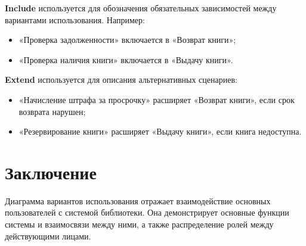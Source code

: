 \documentclass[a4paper,12pt]{article}
\begin{document}
\textbf{Include} используется для обозначения обязательных зависимостей между вариантами использования. Например:
\begin{itemize}
    \item «Проверка задолженности» включается в «Возврат книги»;
    \item «Проверка наличия книги» включается в «Выдачу книги».
\end{itemize}

\textbf{Extend} используется для описания альтернативных сценариев:
\begin{itemize}
    \item «Начисление штрафа за просрочку» расширяет «Возврат книги», если срок возврата нарушен;
    \item «Резервирование книги» расширяет «Выдачу книги», если книга недоступна.
\end{itemize}

\section{Заключение}

Диаграмма вариантов использования отражает взаимодействие основных пользователей с системой библиотеки. 
Она демонстрирует основные функции системы и взаимосвязи между ними, а также распределение ролей между действующими лицами.
\end{document}
